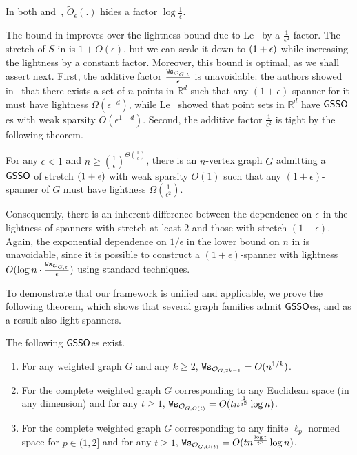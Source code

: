 In both  and~, $\tilde{O}_{\epsilon}(.)$ hides a factor $\log \frac{1}{\epsilon}$.

The bound in  improves over the lightness bound due to Le~\cite{Le20} by a $\frac{1}{\epsilon^2}$ factor. The stretch of $S$ in  is $1+O(\epsilon)$, but we can scale it down to $(1+\epsilon)$ while increasing the lightness by a constant factor. 
Moreover, this bound is optimal, as we shall assert next.
First, the additive factor $\frac{\mathtt{Ws}_{\mathcal{O}_{G,t}}}{\epsilon}$ is unavoidable: the authors showed in~\cite{LS19} that there exists a set of $n$ points in $\mathbb R^d$ such that any $(1+\epsilon)$-spanner for it must have lightness $\Omega(\epsilon^{-d})$, while Le~\cite{Le20} showed that point sets in $\mathbb R^d$ have $\mathsf{GSSO}$es with weak sparsity $O(\epsilon^{1-d})$. 
Second, the additive factor $\frac{1}{\epsilon^2}$ is tight by the following theorem.

\begin{theorem}\label{thm:lb-oracle-1eps}  
	For any $\epsilon < 1$  and $n \geq (\frac{1}{\epsilon})^{\Theta(\frac{1}{\epsilon})}$, there is an $n$-vertex graph $G$  admitting a  $\mathsf{GSSO}$ of stretch $(1+\epsilon)$ with weak sparsity $O(1)$ such that any $(1+\epsilon)$-spanner of $G$ must have lightness $\Omega(\frac{1}{\epsilon^2})$.  
\end{theorem}

Consequently, there is an inherent difference between the dependence on $\epsilon$ in the lightness of spanners with stretch at least $2$ and those with stretch $(1+\epsilon)$. 
Again, the exponential dependence on $1/\epsilon$ in the lower bound on $n$ in  is unavoidable, since it is possible to construct a $(1+\epsilon)$-spanner with lightness $O(\log n \cdot \frac{\mathtt{Ws}_{\mathcal{O}_{G,t}}}{\epsilon})$ using standard techniques.


To demonstrate that our framework is unified and applicable, we prove the following theorem, which shows that several graph families admit $\mathsf{GSSO}$es, and as a result also light spanners. 

\begin{theorem}\label{thm:graph-oracles}The following $\mathsf{GSSO}$es exist.
	\begin{enumerate}[noitemsep]
		\item For any weighted graph $G$ and any $k\geq 2$, $\mathtt{Ws}_{\mathcal{O}_{G,2k-1}} = O(n^{1/k})$.
		\item For the complete weighted graph $G$ corresponding to any Euclidean space (in any dimension) and for any $t\geq 1$, $\mathtt{Ws}_{\mathcal{O}_{G,O(t)}} = O(tn^{\frac{1}{t^2}}\log n)$.
		\item For the complete weighted graph $G$ corresponding to any finite $\ell_p$ normed space for $p \in (1,2]$  and for any $t \ge 1$,  $\mathtt{Ws}_{\mathcal{O}_{G,O(t)}} = O(tn^{\frac{\log t}{t^p}}\log n)$.
	\end{enumerate}
\end{theorem}


